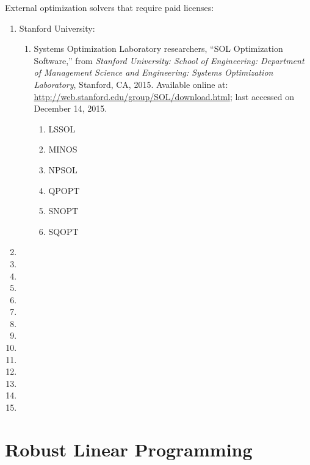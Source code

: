 External optimization solvers that require paid licenses: \vspace{-0.3cm}
\begin{enumerate} \itemsep -4pt
\item Stanford University: \vspace{-0.3cm}
	\begin{enumerate} \itemsep -2pt
	\item Systems Optimization Laboratory researchers, ``SOL Optimization Software,'' from {\it Stanford University: School of Engineering: Department of Management Science and Engineering: Systems Optimization Laboratory}, Stanford, CA, 2015. Available online at: \url{http://web.stanford.edu/group/SOL/download.html}; last accessed on December 14, 2015. \vspace{-0.2cm}
		\begin{enumerate} \itemsep -2pt
		\item LSSOL
		\item MINOS
		\item NPSOL
		\item QPOPT
		\item SNOPT
		\item SQOPT
		\end{enumerate}
	\end{enumerate}
\item 
\item 
\item 
\item 
\item 
\item 
\item 
\item 
\item 
\item 
\item 
\item 
\item 
\item 
\end{enumerate}


\section{Robust Linear Programming}
\label{sec:RobustLinearProgramming}


